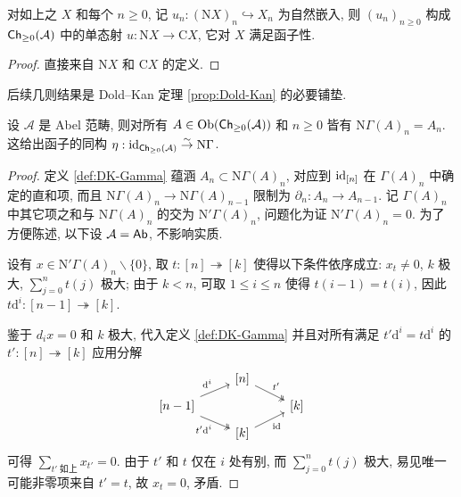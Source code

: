 \begin{proposition}\label{prop:Dold-Kan-u}
	对如上之 $X$ 和每个 $n \geq 0$, 记 $u_n: (\mathrm{N}X)_n \hookrightarrow X_n$ 为自然嵌入, 则 $(u_n)_{n \geq 0}$ 构成 $\mathsf{Ch}_{\geq 0}(\mathcal{A})$ 中的单态射 $u: \mathrm{N}X \to \mathrm{C}X$, 它对 $X$ 满足函子性.
\end{proposition}
\begin{proof}
	直接来自 $\mathrm{N}X$ 和 $\mathrm{C}X$ 的定义.
\end{proof}

后续几则结果是 Dold--Kan 定理 \ref{prop:Dold-Kan} 的必要铺垫.

\begin{lemma}\label{prop:DK-N-unit}
	设 $\mathcal{A}$ 是 Abel 范畴, 则对所有 $A \in \operatorname{Ob}(\mathsf{Ch}_{\geq 0}(\mathcal{A}))$ 和 $n \geq 0$ 皆有 $\mathrm{N}\Gamma(A)_n = A_n$. 这给出函子的同构 $\eta: \mathrm{id}_{\mathsf{Ch}_{\geq 0}(\mathcal{A})} \stackrel{\sim}{\rightarrow} \mathrm{N}\Gamma$.
\end{lemma}
\begin{proof}
	定义 \ref{def:DK-Gamma} 蕴涵 $A_n \subset \mathrm{N}\Gamma(A)_n$, 对应到 $\mathrm{id}_{[n]}$ 在 $\Gamma(A)_n$ 中确定的直和项, 而且 $\mathrm{N}\Gamma(A)_n \to \mathrm{N}\Gamma(A)_{n-1}$ 限制为 $\partial_n: A_n \to A_{n-1}$. 记 $\Gamma(A)_n$ 中其它项之和与 $\mathrm{N}\Gamma(A)_n$ 的交为 $\mathrm{N}'\Gamma(A)_n$, 问题化为证 $\mathrm{N}'\Gamma(A)_n = 0$. 为了方便陈述, 以下设 $\mathcal{A} = \mathsf{Ab}$, 不影响实质.
	
	设有 $x \in \mathrm{N}'\Gamma(A)_n \smallsetminus \{0\}$, 取 $t: [n] \twoheadrightarrow [k]$ 使得以下条件依序成立: $x_t \neq 0$, $k$ 极大, $\sum_{j=0}^n t(j)$ 极大; 由于 $k < n$, 可取 $1 \leq i \leq n$ 使得 $t(i-1) = t(i)$, 因此 $t \mathrm{d}^i: [n-1] \twoheadrightarrow [k]$.
	
	鉴于 $d_i x = 0$ 和 $k$ 极大, 代入定义 \ref{def:DK-Gamma} 并且对所有满足 $t' \mathrm{d}^i = t \mathrm{d}^i$ 的 $t': [n] \twoheadrightarrow [k]$ 应用分解
	\[\begin{tikzcd}[row sep=tiny]
		& {[n]} \arrow[twoheadrightarrow, rd, "{t'}"] & \\
		{[n-1]} \arrow[ru, "{\mathrm{d}^i}"] \arrow[twoheadrightarrow, rd, "{t'\mathrm{d}^i}"'] & & {[k]} \\
		& {[k]} \arrow[ru, "{\identity}"'] &
	\end{tikzcd}\]
	可得 $\sum_{t' \;\text{如上}} x_{t'} = 0$. 由于 $t'$ 和 $t$ 仅在 $i$ 处有别, 而 $\sum_{j=0}^n t(j)$ 极大, 易见唯一可能非零项来自 $t' = t$, 故 $x_t = 0$, 矛盾.
\end{proof}

